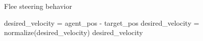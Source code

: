 \begin{algorithm}[H]
    \caption{Flee steering behavior}
    \begin{algorithmic}[1]
        \State desired\_velocity = agent\_pos - target\_pos
        \State desired\_velocity = normalize(desired\_velocity)
        \State \Return desired\_velocity
    \end{algorithmic}
    \label{algorithm:flee}
\end{algorithm}

